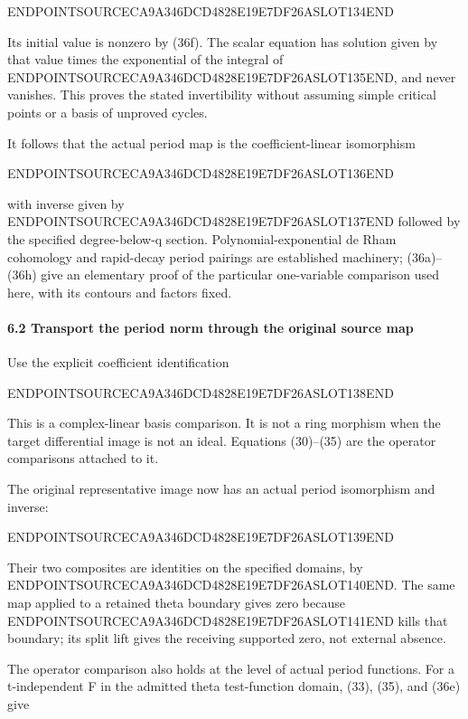 ENDPOINTSOURCECA9A346DCD4828E19E7DF26ASLOT134END

Its initial value is nonzero by (36f). The scalar equation has solution given by that value times the exponential of the integral of ENDPOINTSOURCECA9A346DCD4828E19E7DF26ASLOT135END, and never vanishes. This proves the stated invertibility without assuming simple critical points or a basis of unproved cycles.

It follows that the actual period map is the coefficient-linear isomorphism

ENDPOINTSOURCECA9A346DCD4828E19E7DF26ASLOT136END

with inverse given by ENDPOINTSOURCECA9A346DCD4828E19E7DF26ASLOT137END followed by the specified degree-below-q section. Polynomial-exponential de Rham cohomology and rapid-decay period pairings are established machinery; (36a)--(36h) give an elementary proof of the particular one-variable comparison used here, with its contours and factors fixed.

\paragraph{6.2 Transport the period norm through the original source map}\label{endpoint-exponential_original--transport-the-period-norm-through-the-original-source-map}

Use the explicit coefficient identification

ENDPOINTSOURCECA9A346DCD4828E19E7DF26ASLOT138END

This is a complex-linear basis comparison. It is not a ring morphism when the target differential image is not an ideal. Equations (30)--(35) are the operator comparisons attached to it.

The original representative image now has an actual period isomorphism and inverse:

ENDPOINTSOURCECA9A346DCD4828E19E7DF26ASLOT139END

Their two composites are identities on the specified domains, by ENDPOINTSOURCECA9A346DCD4828E19E7DF26ASLOT140END. The same map applied to a retained theta boundary gives zero because ENDPOINTSOURCECA9A346DCD4828E19E7DF26ASLOT141END kills that boundary; its split lift gives the receiving supported zero, not external absence.

The operator comparison also holds at the level of actual period functions. For a t-independent F in the admitted theta test-function domain, (33), (35), and (36e) give

